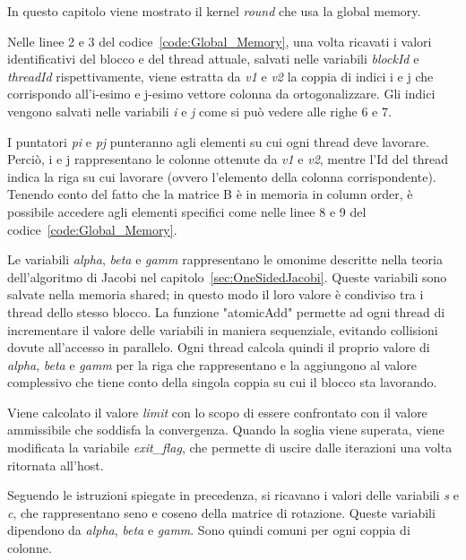 \label{sec:Global}
In questo capitolo viene mostrato il kernel \textit{round} che usa la global memory. 

Nelle linee 2 e 3 del codice~\ref{code:Global_Memory}, una volta ricavati i valori identificativi del blocco e del thread attuale, salvati nelle variabili \textit{blockId} e \textit{threadId} rispettivamente, viene estratta da \textit{v1} e \textit{v2} la coppia di indici i e j che corrispondo all'i-esimo e j-esimo vettore colonna da ortogonalizzare. Gli indici vengono salvati nelle variabili \textit{i} e \textit{j} come si può vedere alle righe 6 e 7.

I puntatori \textit{pi} e \textit{pj} punteranno agli elementi su cui ogni thread deve lavorare. Perciò, i e j rappresentano le colonne ottenute da \textit{v1} e  \textit{v2}, mentre l'Id del thread indica la riga su cui lavorare (ovvero l'elemento della colonna corrispondente). Tenendo conto del fatto che la matrice B è in memoria in column order, è possibile accedere agli elementi specifici come nelle linee 8 e 9 del codice~\ref{code:Global_Memory}.

Le variabili \textit{alpha}, \textit{beta} e \textit{gamm} rappresentano le omonime descritte nella teoria dell'algoritmo di Jacobi nel capitolo~\ref{sec:OneSidedJacobi}. Queste variabili sono salvate nella memoria shared; in questo modo il loro valore è condiviso tra i thread dello stesso blocco. La funzione "atomicAdd" permette ad ogni thread di incrementare il valore delle variabili in maniera sequenziale, evitando collisioni dovute all'accesso in parallelo.
Ogni thread calcola quindi il proprio valore di \textit{alpha}, \textit{beta} e \textit{gamm} per la riga che rappresentano e la aggiungono al valore complessivo che tiene conto della singola coppia su cui il blocco sta lavorando.

Viene calcolato il valore \textit{limit} con lo scopo di essere confrontato con il valore ammissibile che soddisfa la convergenza. Quando la soglia viene superata, viene modificata la variabile \textit{exit\_flag}, che permette di uscire dalle iterazioni una volta ritornata all'host.

Seguendo le istruzioni spiegate in precedenza, si ricavano i valori delle variabili \textit{s} e \textit{c}, che rappresentano seno e coseno della matrice di rotazione. Queste variabili dipendono da \textit{alpha}, \textit{beta} e \textit{gamm}. Sono quindi comuni per ogni coppia di colonne.

